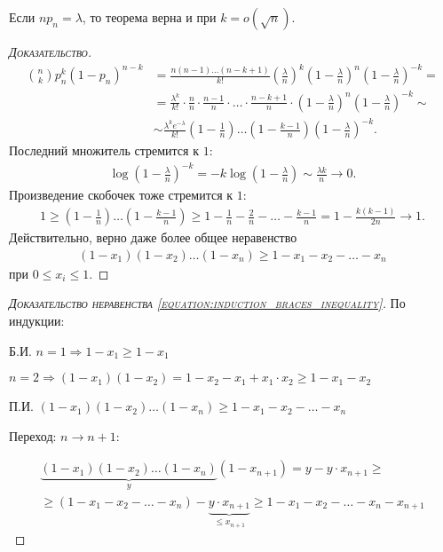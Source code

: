 \begin{remrk*}
 Если $np_n = \lambda$, то теорема \label{theorem:poisson} верна и при $k = o(\sqrt{n})$.
\end{remrk*}
\begin{proof}[\normalfont\textsc{Доказательство}]
 \begin{align*}
  \binom n k p_n^{k} (1-p_n)^{n-k} &= \frac{n(n-1)\ldots(n-k+1)}{k!} \left( \frac{\lambda}{n} \right)^{k}\left(1 - \frac{\lambda}{n}\right)^{n} \left( 1 - \frac{\lambda}{n} \right)^{-k} = \\
  &=  \frac{\lambda^{k}}{k!} \cdot \frac{n}{n} \cdot \frac{n-1}{n} \cdot \ldots \cdot \frac{n-k+1}{n} \cdot \left( 1 - \frac{\lambda}{n} \right)^{n} \left( 1 - \frac{\lambda}{n} \right)^{-k} \sim \\
  &\sim \frac{\lambda^{k}e^{-\lambda}}{k!} \left( 1 - \frac{1}{n} \right) \ldots \left(1 - \frac{k - 1}{n}\right) \left( 1 - \frac{\lambda}{n} \right)^{-k}
 .\end{align*} Последний множитель стремится к $1$:
 \begin{align*}
  \log \left( 1 - \frac{\lambda}{n} \right)^{-k} = -k \log \left( 1 - \frac{\lambda}{n} \right) \sim \frac{\lambda k}{n} \to 0
 .\end{align*} Произведение скобочек тоже стремится к $1$:
 \begin{align*}
  1 \geqslant \left( 1 - \frac{1}{n} \right) \ldots \left( 1 - \frac{k-1}{n} \right) \geqslant 1 - \frac{1}{n} - \frac{2}{n} - \ldots - \frac{k - 1}{n} = 1- \frac{k(k-1)}{2n} \to 1
  .\end{align*} Действительно, верно даже более общее неравенство
  \begin{align}
   \label{equation:induction_braces_inequality}
  (1-x_1)(1-x_2)\ldots(1-x_n) \geqslant 1 - x_1 - x_2 - \ldots - x_n
 \end{align}  при $0 \leqslant x_i \leqslant 1$.
\end{proof}

\begin{proof}[\normalfont\textsc{Доказательство неравенства \eqref{equation:induction_braces_inequality}}]
 По индукции:

 Б.И. $n = 1 \Rightarrow 1 - x_1 \geq 1 - x_1$ 

 $n = 2 \Rightarrow (1 - x_1)(1 - x_2) = 1 - x_2 - x_1 + x_1 \cdot x_2 \geq 1 - x_1 - x_2$

 П.И. $(1 - x_1)(1 - x_2) \dots (1 - x_n) \geq 1 - x_1 - x_2 - \dots - x_n$

 Переход: $n \to n + 1$:

 \begin{align*}
  \underbrace{(1 - x_1)(1 - x_2) \dots (1 - x_n)}_{y}(1-x_{n + 1}) = y - y \cdot x_{n+1} \geq \\ \geq(1 - x_1 - x_2 - \dots - x_n) - \underbrace{y \cdot x_{n + 1}}_{\leq x_{n + 1}} \geq 1 - x_1 - x_2 - \dots - x_n - x_{n + 1}
 \end{align*}
\end{proof}

